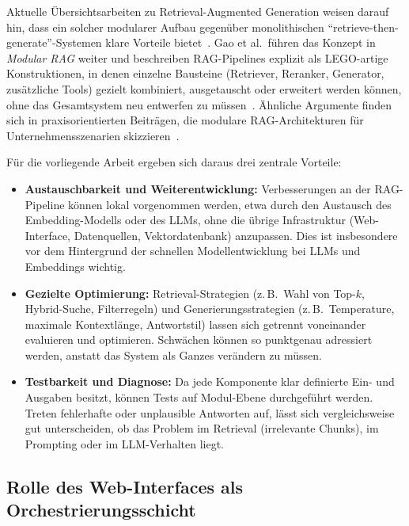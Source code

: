 Aktuelle Übersichtsarbeiten zu Retrieval-Augmented Generation weisen darauf hin, dass ein solcher modularer Aufbau gegenüber monolithischen \enquote{retrieve-then-generate}-Systemen klare Vorteile bietet~\cite{Gao2023RAGSurvey}.
Gao et al.\ führen das Konzept in \emph{Modular RAG} weiter und beschreiben RAG-Pipelines explizit als \glqq LEGO-artige\grqq{} Konstruktionen, in denen einzelne Bausteine (Retriever, Reranker, Generator, zusätzliche Tools) gezielt kombiniert, ausgetauscht oder erweitert werden können, ohne das Gesamtsystem neu entwerfen zu müssen~\cite{Gao2024ModularRAG}.
Ähnliche Argumente finden sich in praxisorientierten Beiträgen, die modulare RAG-Architekturen für Unternehmensszenarien skizzieren~\cite{Markov2025ModularRAG,RidgeRun2024OnPremRAG}.

Für die vorliegende Arbeit ergeben sich daraus drei zentrale Vorteile:

\begin{itemize}
    \item \textbf{Austauschbarkeit und Weiterentwicklung:}
    Verbesserungen an der RAG-Pipeline können lokal vorgenommen werden, etwa durch den Austausch des Embedding-Modells oder des LLMs, ohne die übrige Infrastruktur (Web-Interface, Datenquellen, Vektordatenbank) anzupassen.
    Dies ist insbesondere vor dem Hintergrund der schnellen Modellentwicklung bei LLMs und Embeddings wichtig.

    \item \textbf{Gezielte Optimierung:}
    Retrieval-Strategien (z.\,B.\ Wahl von Top-$k$, Hybrid-Suche, Filterregeln) und Generierungsstrategien (z.\,B.\ Temperature, maximale Kontextlänge, Antwortstil) lassen sich getrennt voneinander evaluieren und optimieren.
    Schwächen können so punktgenau adressiert werden, anstatt das System als Ganzes verändern zu müssen.

    \item \textbf{Testbarkeit und Diagnose:}
    Da jede Komponente klar definierte Ein- und Ausgaben besitzt, können Tests auf Modul-Ebene durchgeführt werden.
    Treten fehlerhafte oder unplausible Antworten auf, lässt sich vergleichsweise gut unterscheiden, ob das Problem im Retrieval (irrelevante Chunks), im Prompting oder im LLM-Verhalten liegt.
\end{itemize}

\subsection{Rolle des Web-Interfaces als Orchestrierungsschicht}\label{subsec:rolle-des-web-interfaces-als-orchestrierungsschicht}

